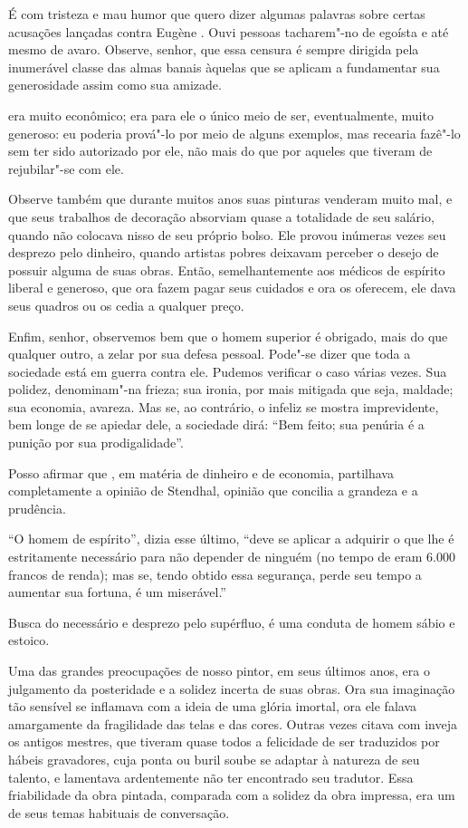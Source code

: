 É com tristeza e mau humor que quero dizer algumas palavras sobre certas
acusações lançadas contra Eugène . Ouvi pessoas tacharem"-no de
egoísta e até mesmo de avaro. Observe, senhor, que essa censura é sempre
dirigida pela inumerável classe das almas banais àquelas que se aplicam
a fundamentar sua generosidade assim como sua amizade.

 era muito econômico; era para ele o único meio de ser,
eventualmente, muito generoso: eu poderia prová"-lo por meio de alguns
exemplos, mas recearia fazê"-lo sem ter sido autorizado por ele, não
mais do que por aqueles que tiveram de rejubilar"-se com ele.

Observe também que durante muitos anos suas pinturas venderam muito mal,
e que seus trabalhos de decoração absorviam quase a totalidade de seu
salário, quando não colocava nisso de seu próprio bolso. Ele provou
inúmeras vezes seu desprezo pelo dinheiro, quando artistas pobres
deixavam perceber o desejo de possuir alguma de suas obras. Então,
semelhantemente aos médicos de espírito liberal e generoso, que ora fazem
pagar seus cuidados e ora os oferecem, ele dava seus quadros ou os
cedia a qualquer preço.

Enfim, senhor, observemos bem que o homem superior é obrigado, mais do
que qualquer outro, a zelar por sua defesa pessoal. Pode"-se dizer que
toda a sociedade está em guerra contra ele. Pudemos verificar o caso
várias vezes. Sua polidez, denominam"-na frieza; sua ironia, por mais
mitigada que seja, maldade; sua economia, avareza. Mas se, ao
contrário, o infeliz se mostra imprevidente, bem longe de se apiedar
dele, a sociedade dirá: ``Bem feito; sua penúria é a
punição por sua prodigalidade''.

Posso afirmar que , em matéria de dinheiro e de economia,
partilhava completamente a opinião de Stendhal, opinião que concilia a
grandeza e a prudência.

``O homem de espírito'', dizia esse último,
``deve se aplicar a adquirir o que lhe é estritamente
necessário para não depender de ninguém (no tempo de  eram
6.000 francos de renda); mas se, tendo obtido essa segurança, perde seu
tempo a aumentar sua fortuna, é um miserável.''

Busca do necessário e desprezo pelo supérfluo, é uma conduta de homem
sábio e estoico.

Uma das grandes preocupações de nosso pintor, em seus últimos anos, era
o julgamento da posteridade e a solidez incerta de suas obras. Ora sua
imaginação tão sensível se inflamava com a ideia de uma glória imortal,
ora ele falava amargamente da fragilidade das telas e das cores. Outras
vezes citava com inveja os antigos mestres, que tiveram quase todos a
felicidade de ser traduzidos por hábeis gravadores, cuja ponta ou buril
soube se adaptar à natureza de seu talento, e lamentava ardentemente
não ter encontrado seu tradutor. Essa friabilidade da obra pintada,
comparada com a solidez da obra impressa, era um de seus temas
habituais de conversação.

